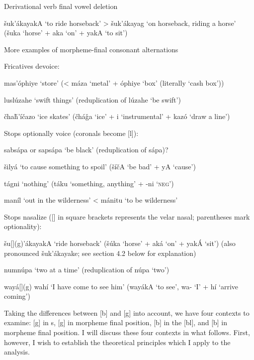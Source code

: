 \documentclass[output=paper]{LSP/langsci}
\begin{document}
\begin{exe}
\ex \label{ex:rood:7}
Derivational verb final vowel deletion

\v{s}uk'\'akayakA `to ride horseback' > \v{s}uk'\'akayag `on horseback, riding a horse' (\v{s}uka `horse' + aka `on' + yakA `to sit')
\end{exe}

\begin{exe}
\ex \label{ex:rood:8}
More examples of morpheme-final consonant alternations
\begin{xlist}
\ex Fricatives devoice:

mas'\'ophiye `store' (< m\'aza `metal' + \'ophiye `box' (literally `cash box'))

lusl\'uzahe `swift things' (reduplication of l\'uzahe `be swift')

\v{c}ha\v{h}'\'i\v{c}azo `ice skates' (\v{c}h\'a\v{g}a `ice' + i `instrumental' + kaz\'o `draw a line')

\ex Stops optionally voice (coronals become [l]):

sabs\'apa or saps\'apa `be black' (reduplication of s\'apa)?

\v{s}ily\'a `to cause something to spoil' (\v{s}\'i\v{c}A `be bad' + yA `cause')

t\'agni `nothing' (t\'aku `something, anything' + -ni `\textsc{neg}')

man\'il `out in the wilderness' < m\'anitu `to be wilderness'

\ex Stops nasalize ([] in square brackets represents the velar nasal; parentheses mark optionality):

\v{s}u[](g)'\'akayakA `ride horseback' (\v{s}\'uka `horse' + ak\'a `on' + yak\'A `sit') (also pronounced \v{s}uk'\'akayake; see section 4.2 below for explanation)

numn\'upa `two at a time' (reduplication of n\'upa `two')

way\'a[](g) wah\'i `I have come to see him' (way\'akA `to see', wa- `I' + h\'i `arrive coming')
\end{xlist}
\end{exe}

Taking the differences between [b] and [g] into account, we have four contexts to examine: [g] in s, [g] in morpheme final position, [b] in the  [bl], and [b] in morpheme final position. I will discuss these four contexts in what follows. First, however, I wish to establish the theoretical principles which I apply to the analysis.
\end{document}
